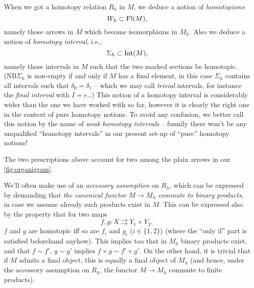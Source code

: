 When we got a homotopy relation $R_h$ in $M$, we deduce a notion of
\emph{homotopisms}
\[ W_h\subset\operatorname{Fl}(M),\]
namely those arrows in $M$ which become isomorphisms in $M_h$. Also
we deduce a notion of \emph{homotopy interval}, i.e.,
\[\Sigma_h\subset\operatorname{Int}(M),\]
namely those intervals \bI{} in $M$ such that the two marked sections
be homotopic. (NB\enspace $\Sigma_h$ is non-empty if and only if $M$ has a
final element, in this case $\Sigma_h$ contains all intervals such
that $\delta_0=\delta_1$ -- which we may call \emph{trivial}
intervals, for instance the \emph{final interval} with $I=e$\ldots)
This notion of a homotopy interval is considerably wider than the one
we have worked with so far, however it is clearly the right one in the
context of pure homotopy notions. To avoid any confusion, we better
call this notion by the name of \emph{weak homotopy intervals} --
funnily there won't be any unqualified ``homotopy intervals'' in our
present set-up of ``pure'' homotopy notions!

The two prescriptions above account for two among the plain arrows in
our \ref{fig:organigram}.

We'll often make use of an \emph{accessory assumption} on $R_h$, which
can be expressed by demanding that \emph{the canonical functor $M\to
  M_h$ commute to binary products}, in case we assume already such
products exist in $M$. This can be expressed also by the property that
for two maps
\[f,g: X \rightrightarrows Y_1\times Y_2,\]
$f$ and $g$ are homotopic if{f} so are $f_i$ and $g_i$ ($i\in\{1,2\}$)
(where the ``only if'' part is satisfied beforehand anyhow). This
implies too that in $M_h$ binary products exist, and that $f\sim f'$,
$g\sim g'$ implies $f\times g\sim f'\times g'$. On the other hand, it
is trivial that if $M$ admits a final object, this is equally a final
object of $M_h$ (and hence, under the accessory assumption on $R_h$,
the functor $M\to M_h$ commute to finite products).

